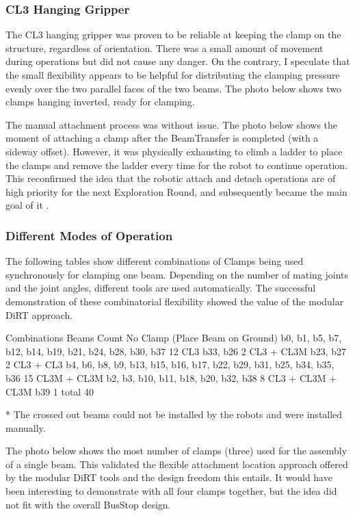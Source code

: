 \subsubsection{CL3 Hanging Gripper}
\label{subsubsection:exploration-2-cl3-hanging-gripper}

The CL3 hanging gripper was proven to be reliable at keeping the clamp on the structure, regardless of orientation. There was a small amount of movement during operations but did not cause any danger. On the contrary, I speculate that the small flexibility appears to be helpful for distributing the clamping pressure evenly over the two parallel faces of the two beams.  The photo below shows two clamps hanging inverted, ready for clamping.

The manual attachment process was without issue. The photo below shows the moment of attaching a clamp after the BeamTransfer is completed (with a sideway offset). However, it was physically exhausting to climb a ladder to place the clamps and remove the ladder every time for the robot to continue operation. This reconfirmed the idea that the robotic attach and detach operations are of high priority for the next Exploration Round, and subsequently became the main goal of it .

\subsubsection{Different Modes of Operation}
\label{subsubsection:exploration-2-different-modes-of-operation}

The following tables show different combinations of Clamps being used synchronously for clamping one beam. Depending on the number of mating joints and the joint angles, different tools are used automatically. The successful demonstration of these combinatorial flexibility showed the value of the modular DiRT approach. 

Combinations
Beams
Count
No Clamp
(Place Beam on Ground)
b0, b1, b5, b7, b12, b14, b19, b21, b24, b28, b30, b37
12
CL3
b33, b26
2
CL3 + CL3M
b23, b27
2
CL3 + CL3
b4, b6, b8, b9, b13, b15, b16, b17, b22, b29, b31, b25, b34, b35, b36
15
CL3M + CL3M
b2, b3, b10, b11, b18, b20, b32, b38
8
CL3 + CL3M + CL3M
b39
1
total
40

* The crossed out beams could not be installed by the robots and were installed manually.

The photo below shows the most number of clamps (three) used for the assembly of a single beam. This validated the flexible attachment location approach offered by the modular DiRT tools and the design freedom this entails. It would have been interesting to demonstrate with all four clamps together, but the idea did not fit with the overall BusStop design.


